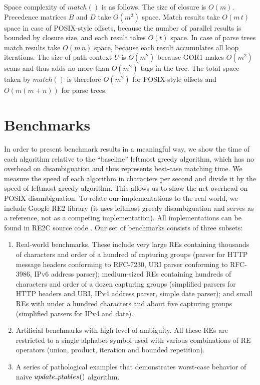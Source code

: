 \documentclass[AMA,STIX1COL]{WileyNJD-v2}
\newcommand{\Xund}{\rule{.4em}{.4pt}}
\begin{document}
Space complexity of $match()$ is as follows.
%
The size of closure is $O(m)$.
%
Precedence matrices $B$ and $D$ take $O(m^2)$ space.
%
Match results take $O(m \, t)$ space in case of POSIX-style offsets,
because the number of parallel results is bounded by closure size,
and each result takes $O(t)$ space.
In case of parse trees match results take $O(m \, n)$ space, because each result accumulates all loop iterations.
%
The size of path context $U$ is $O(m^2)$
because GOR1 makes $O(m^2)$ scans and thus adds no more than $O(m^2)$ tags in the tree.
The total space taken by $match()$ is therefore $O(m^2)$
for POSIX-style offsets and $O(m (m + n))$ for parse trees.


\section{Benchmarks}\label{section_benchmarks}

In order to present benchmark results in a meaningful way,
we show the time of each algorithm relative to the ``baseline'' leftmost greedy algorithm,
which has no overhead on disambiguation and thus represents best-case matching time.
%
We measure the speed of each algorithm in characters per second
and divide it by the speed of leftmost greedy algorithm.
%
This allows us to show the net overhead on POSIX disambiguation.
%
To relate our implementations to the real world,
we include Google RE2 library (it uses leftmost greedy disambiguation and serves as a reference, not as a competing implementation).
%
All implementations can be found in RE2C source code \cite{RE2C}.
%
Our set of benchmarks consists of three subsets:
\begin{enumerate}[itemsep=0.5em, topsep=0.5em]
    \item Real-world benchmarks.
        These include very large REs containing thousands of characters and order of a hundred of capturing groups
        (parser for HTTP message headers conforming to RFC-7230,
        URI parser conforming to RFC-3986,
        IPv6 address parser);
        medium-sized REs containing hundreds of characters and order of a dozen capturing groups
        (simplified parsers for HTTP headers and URI, IPv4 address parser, simple date parser);
        and small REs with under a hundred characters and about five capturing groups
        (simplified parsers for IPv4 and date).

    \item Artificial benchmarks with high level of ambiguity.
        All these REs are restricted to a single alphabet symbol
        used with various combinations of RE operators (union, product, iteration and bounded repetition).

    \item A series of pathological examples that demonstrates worst-case behavior of naive $update \Xund ptables ()$ algorithm.
\end{enumerate}
\end{document}
